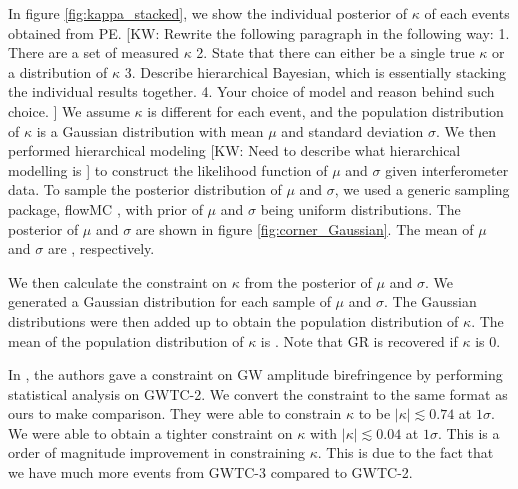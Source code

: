 \documentclass[aps,prd,twocolumn,superscriptaddress,preprintnumbers,floatfix,nofootinbib]{revtex4-2}
\newcommand{\kw}[1]{{\color{rb4}[KW: #1 ]}}
\begin{document}
In figure \ref{fig:kappa_stacked}, we show the individual posterior of $\kappa$
of each events obtained from PE. \kw{Rewrite the following paragraph in the
following way: 1. There are a set of measured $\kappa$ 2. State that there can
either be a single true $\kappa$ or a distribution of $\kappa$ 3. Describe
hierarchical Bayesian, which is essentially stacking the individual results
together. 4. Your choice of model and reason behind such choice.} We assume
$\kappa$ is different for each event, and the population distribution of
$\kappa$ is a Gaussian distribution with mean $\mu$ and standard deviation
$\sigma$. We then performed hierarchical modeling \kw{Need to describe what
hierarchical modelling is} to construct the likelihood function of $\mu$ and
$\sigma$ given interferometer data. To sample the posterior distribution of
$\mu$ and $\sigma$, we used a generic sampling package, flowMC \citep{flowMC},
with prior of $\mu$ and $\sigma$ being uniform distributions. The posterior of
$\mu$ and $\sigma$ are shown in figure \ref{fig:corner_Gaussian}. The mean of
$\mu$ and $\sigma$ are , respectively.


We then calculate the constraint on $\kappa$ from the posterior of $\mu$ and $\sigma$.
We generated a Gaussian distribution for each sample of $\mu$ and $\sigma$.
The Gaussian distributions were then added up to obtain the population distribution of $\kappa$.
The mean of the population distribution of $\kappa$ is .
Note that GR is recovered if $\kappa$ is $0$.

In \citet{Okounkova_2022}, the authors gave a constraint on GW amplitude birefringence by performing statistical analysis on GWTC-2.
We convert the constraint to the same format as ours to make comparison.
They were able to constrain $\kappa$ to be $|\kappa| \lesssim 0.74$ at $1 \sigma$.
We were able to obtain a tighter constraint on $\kappa$ with $|\kappa| \lesssim 0.04$ at $1 \sigma$.
This is a order of magnitude improvement in constraining $\kappa$.
This is due to the fact that we have much more events from GWTC-3 compared to GWTC-2.
\end{document}
